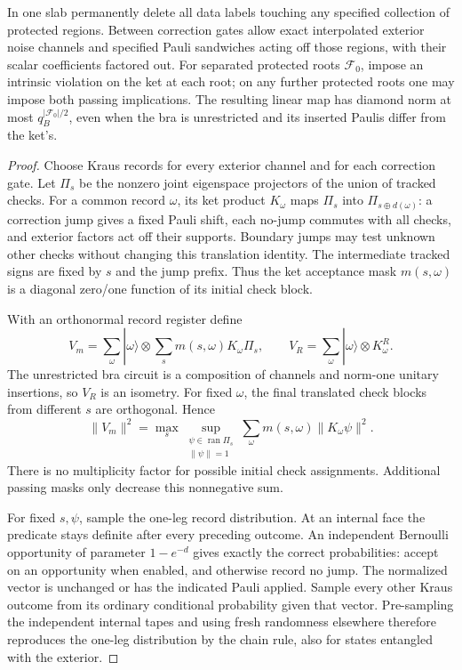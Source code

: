 \begin{lemma}\label{lem:halo-filter}
In one slab permanently delete all data labels touching any
specified collection of protected regions. Between correction
gates allow exact interpolated exterior noise channels and
specified Pauli sandwiches acting off those regions, with
their scalar coefficients factored out.
For separated protected roots \(\mathcal F_0\), impose an
intrinsic violation on the ket at each root; on any further
protected roots one may impose both passing implications.
The resulting linear map has diamond norm at most
\(q_B^{|\mathcal F_0|/2}\), even when the bra is unrestricted
and its inserted Paulis differ from the ket's.
\end{lemma}
\begin{proof}
Choose Kraus records for every exterior channel and for each
correction gate. Let \(\Pi_s\) be the nonzero joint eigenspace
projectors of the union of tracked checks.
For a common record \(\omega\), its ket product \(K_\omega\)
maps \(\Pi_s\) into \(\Pi_{s\oplus d(\omega)}\):
a correction jump gives a fixed Pauli shift, each no-jump
commutes with all checks, and exterior factors act off their
supports. Boundary jumps may test unknown other checks
without changing this translation identity.
The intermediate tracked signs are fixed by \(s\) and the
jump prefix. Thus the ket acceptance mask \(m(s,\omega)\)
is a diagonal zero/one function of its initial check block.

With an orthonormal record register define
\[
 V_m=\sum_\omega|\omega\rangle\otimes
                 \sum_s m(s,\omega)K_\omega\Pi_s,\qquad
 V_R=\sum_\omega|\omega\rangle\otimes K^R_\omega .
\]
The unrestricted bra circuit is a composition of channels
and norm-one unitary insertions, so \(V_R\) is an isometry.
For fixed \(\omega\), the final translated check blocks
from different \(s\) are orthogonal. Hence
\[
 \|V_m\|^2=
 \max_s\sup_{\substack{\psi\in\operatorname{ran}\Pi_s\\\|\psi\|=1}}
       \sum_\omega m(s,\omega)\|K_\omega\psi\|^2 .
\]
There is no multiplicity factor for possible initial
check assignments. Additional passing masks only decrease
this nonnegative sum.

For fixed \(s,\psi\), sample the one-leg record distribution.
At an internal face the predicate stays definite after
every preceding outcome. An independent Bernoulli opportunity
of parameter \(1-e^{-d}\) gives exactly the correct
probabilities: accept on an opportunity when enabled,
and otherwise record no jump. The normalized vector is
unchanged or has the indicated Pauli applied.
Sample every other Kraus outcome from its ordinary
conditional probability given that vector.
Pre-sampling the independent internal tapes and using
fresh randomness elsewhere therefore reproduces the
one-leg distribution by the chain rule, also for states
entangled with the exterior.


\end{proof}
